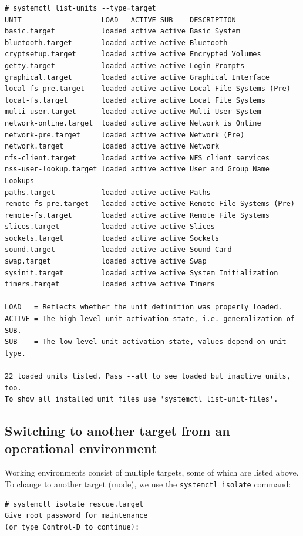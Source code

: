 \vspace{-15pt}
\begin{verbatim}
# systemctl list-units --type=target
UNIT                   LOAD   ACTIVE SUB    DESCRIPTION
basic.target           loaded active active Basic System
bluetooth.target       loaded active active Bluetooth
cryptsetup.target      loaded active active Encrypted Volumes
getty.target           loaded active active Login Prompts
graphical.target       loaded active active Graphical Interface
local-fs-pre.target    loaded active active Local File Systems (Pre)
local-fs.target        loaded active active Local File Systems
multi-user.target      loaded active active Multi-User System
network-online.target  loaded active active Network is Online
network-pre.target     loaded active active Network (Pre)
network.target         loaded active active Network
nfs-client.target      loaded active active NFS client services
nss-user-lookup.target loaded active active User and Group Name Lookups
paths.target           loaded active active Paths
remote-fs-pre.target   loaded active active Remote File Systems (Pre)
remote-fs.target       loaded active active Remote File Systems
slices.target          loaded active active Slices
sockets.target         loaded active active Sockets
sound.target           loaded active active Sound Card
swap.target            loaded active active Swap
sysinit.target         loaded active active System Initialization
timers.target          loaded active active Timers

LOAD   = Reflects whether the unit definition was properly loaded.
ACTIVE = The high-level unit activation state, i.e. generalization of SUB.
SUB    = The low-level unit activation state, values depend on unit type.

22 loaded units listed. Pass --all to see loaded but inactive units, too.
To show all installed unit files use 'systemctl list-unit-files'.
\end{verbatim}
\vspace{-10pt}

\subsection{Switching to another target from an operational environment}
Working environments consist of multiple targets, some of which are listed above. To change to another target (mode), we use the \verb|systemctl isolate| command:

\vspace{-15pt}
\begin{verbatim}
# systemctl isolate rescue.target
Give root password for maintenance
(or type Control-D to continue):
\end{verbatim}
\vspace{-10pt}

